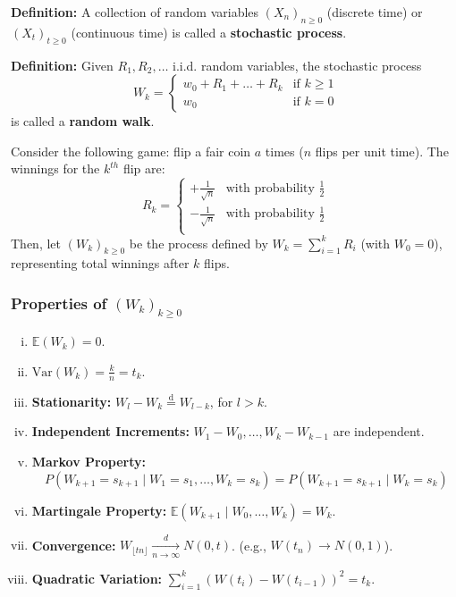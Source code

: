 \textbf{Definition: } A collection of random variables \((X_n)_{n \ge 0}\) (discrete time) or \((X_t)_{t \ge 0}\) (continuous time) is called a \textbf{stochastic process}.

\textbf{Definition: } Given \(R_1, R_2, \dots\) i.i.d. random variables, the stochastic process
\begin{equation*}
    W_k = \begin{cases}
        w_0 + R_1 + \dots + R_k & \text{if } k \ge 1 \\
        w_0 & \text{if } k = 0
    \end{cases}
\end{equation*}
is called a \textbf{random walk}.

Consider the following game: flip a fair coin \(a\) times ($n$ flips per unit time). The winnings for the \(k^{th}\) flip are:
\begin{equation*}
    R_k = \begin{cases}
        +\frac{1}{\sqrt{n}} & \text{with probability } \frac{1}{2} \\
        -\frac{1}{\sqrt{n}} & \text{with probability } \frac{1}{2} \\
    \end{cases}
\end{equation*}
Then, let \((W_k)_{k \ge 0}\) be the process defined by \(W_k = \sum_{i=1}^k R_i\) (with $W_0=0$), representing total winnings after $k$ flips.

\subsubsection{Properties of $(W_k)_{k \ge 0}$}
\begin{enumerate}[i.]
    \item \(\mathbb{E}(W_k) = 0\).
    \item \(\text{Var}(W_k) = \frac{k}{n}=t_k\).
    \item \textbf{Stationarity:} \(W_l - W_k \stackrel{\text{d}}{=} W_{l-k}\), for \(l > k\).
    \item \textbf{Independent Increments:} \(W_1-W_0, \dots, W_k - W_{k-1}\) are independent.
    \item \textbf{Markov Property:}
    \begin{equation*}
        P(W_{k+1} = s_{k+1} \mid W_1 = s_1, \dots, W_k = s_k) = P(W_{k+1} = s_{k+1} \mid W_k = s_k)
    \end{equation*}
    \item \textbf{Martingale Property:} \(\mathbb{E}(W_{k+1} \mid W_0, \dots, W_k) = W_k\).
    \item \textbf{Convergence:} \(W_{\lfloor tn \rfloor} \xrightarrow[n \to \infty]{d} N(0,t)\). (e.g., \(W(t_n) \rightarrow N(0,1)\)).
    \item \textbf{Quadratic Variation:} \(\sum_{i=1}^k (W(t_i) - W(t_{i-1}))^2 = t_k\).
\end{enumerate}

